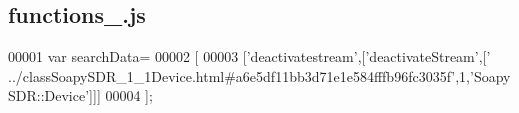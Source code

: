 \subsection{functions\+\_.\+js}
\label{functions__2_8js_source}

\begin{DoxyCode}
00001 var searchData=
00002 [
00003   [\textcolor{stringliteral}{'deactivatestream'},[\textcolor{stringliteral}{'deactivateStream'},[\textcolor{stringliteral}{'
      ../classSoapySDR\_1\_1Device.html#a6e5df11bb3d71e1e584fffb96fc3035f'},1,\textcolor{stringliteral}{'SoapySDR::Device'}]]]
00004 ];
\end{DoxyCode}
